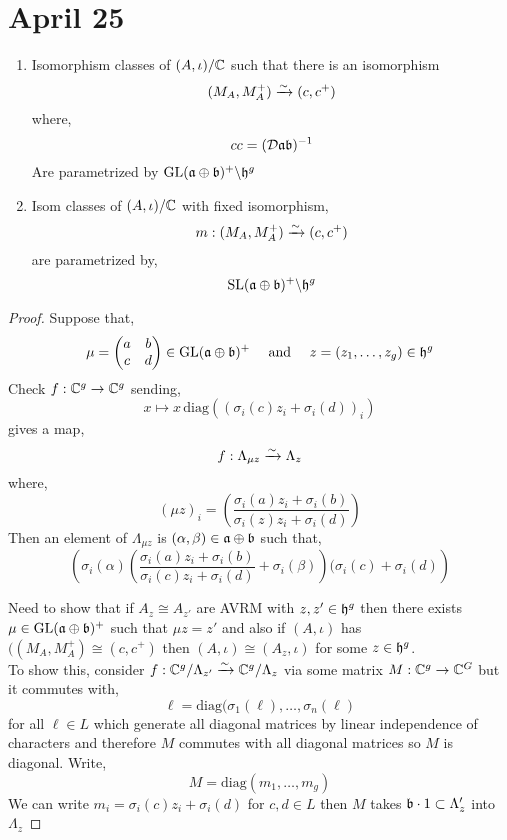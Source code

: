 \documentclass[12pt]{article}
\begin{document}
\section{April 25}

\begin{thm}
\begin{enumerate}
\item Isomorphism classes of $(A, \iota) / \mathbb{C}$ such that there is an isomorphism
\[ (M_A, M_A^+) \xrightarrow{\sim} (c, c^+) \]
where,
\[ cc = (\mathcal{D} \mathfrak{a} \mathfrak{b})^{-1} \]
Are parametrized by $\mathrm{GL}(\mathfrak{a} \oplus \mathfrak{b})^+ \backslash \mathfrak{h}^g$
\item Isom classes of $(A, \iota) / \mathbb{C}$ with fixed isomorphism,
\[ m : (M_A, M_A^+) \xrightarrow{\sim} (c, c^+) \]
are parametrized by,
\[ \mathrm{SL}(\mathfrak{a} \oplus \mathfrak{b})^+ \backslash \mathfrak{h}^g \]
\end{enumerate}
\end{thm}

\begin{proof}
Suppose that,
\[ \mu = \begin{pmatrix}
a & b 
\\
c & d
\end{pmatrix} \in \mathrm{GL}(\mathfrak{a} \oplus \mathfrak{b})^+ \quad \text{ and } \quad z = (z_1, \dots, z_g) \in \mathfrak{h}^g \]
Check $f : \mathbb{C}^g \to \mathbb{C}^g$ sending,
\[  x \mapsto x \, \mathrm{diag}((\sigma_i(c) z_i + \sigma_i(d))_i) \]
gives a map,
\[ f : \Lambda_{\mu z} \xrightarrow{\sim} \Lambda_z \]
where,
\[ (\mu z)_i = \left( \frac{\sigma_i(a) z_i + \sigma_i(b)}{\sigma_i(z) z_i + \sigma_i(d)} \right) \]
Then an element of $\Lambda_{\mu z}$ is $(\alpha, \beta) \in \mathfrak{a} \oplus \mathfrak{b}$ such that,
\[ \left( \sigma_i(\alpha) \left( \frac{\sigma_i(a) z_i + \sigma_i(b)}{\sigma_i(c) z_i + \sigma_i(d)} + \sigma_i(\beta) \right) (\sigma_i(c) + \sigma_i(d) \right) \]



Need to show that if $A_z \cong A_{z'}$ are AVRM with $z, z' \in \mathfrak{h}^g$ then there exists $\mu \in \mathrm{GL}(\mathfrak{a} \oplus \mathfrak{b})^+$ such that $\mu z = z'$ and also if $(A, \iota)$ has $((M_A, M_A^+) \cong (c, c^+)$ then $(A, \iota) \cong (A_z, \iota)$ for some $z \in \mathfrak{h}^g$. 
\bigskip\\
To show this, consider $f : \mathbb{C}^g / \Lambda_{z'} \xrightarrow{\sim} \mathbb{C}^g / \Lambda_z$ via some matrix $M : \mathbb{C}^g \to \mathbb{C}^G$ but it commutes with,
\[ \ell = \mathrm{diag}(\sigma_1(\ell), \dots, \sigma_n(\ell) \]
for all $\ell \in L$ which generate all diagonal matrices by linear independence of characters and therefore $M$ commutes with all diagonal matrices so $M$ is diagonal. Write,
\[ M = \mathrm{diag}(m_1, \dots, m_g) \]
We can write $m_i = \sigma_i(c) z_i + \sigma_i(d)$ for $c, d \in L$ then $M$ takes $\mathfrak{b} \cdot 1 \subset \Lambda_z'$ into $\Lambda_z$
\end{proof}
\end{document}
